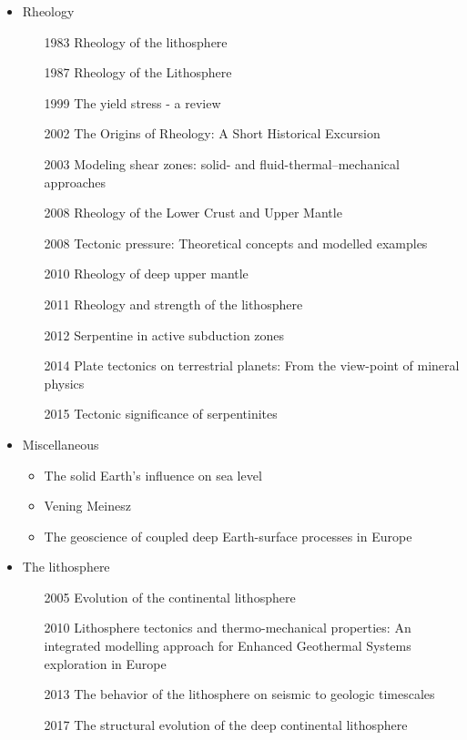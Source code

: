 \begin{itemize}
\item Rheology 
   \begin{itemize}
   \item [1983] Rheology of the lithosphere \cite{kirb83}
   \item [1987] Rheology of the Lithosphere \cite{kikr87}
   \item [1999] The yield stress - a review \cite{barn99}
   \item [2002] The Origins of Rheology: A Short Historical Excursion \cite{dora02}
   \item [2003] Modeling shear zones: solid- and fluid-thermal–mechanical approaches \cite{reyu03}
   \item [2008] Rheology of the Lower Crust and Upper Mantle \cite{budr08}
   \item [2008] Tectonic pressure: Theoretical concepts and modelled examples \cite{manc08}
   \item [2010] Rheology of deep upper mantle \cite{kara10}
   \item [2011] Rheology and strength of the lithosphere \cite{buro11}
   \item [2012] Serpentine in active subduction zones \cite{reyn12}
   \item [2014] Plate tectonics on terrestrial planets: From the view-point of mineral physics \cite{kara14}
   \item [2015] Tectonic significance of serpentinites \cite{gusr15}
   \end{itemize}

\item Miscellaneous
   \begin{itemize}
   \item The solid Earth’s influence on sea level \cite{conr13}  
   \item Vening Meinesz \cite{vlaa89}
   \item The geoscience of coupled deep Earth-surface processes in Europe \cite{clzb07}
   \end{itemize}

\item The lithosphere
   \begin{itemize}
   \item [2005] Evolution of the continental lithosphere \cite{slee05}
   \item [2010] Lithosphere tectonics and thermo-mechanical properties: An integrated modelling
         approach for Enhanced Geothermal Systems exploration in Europe \cite{clvz10}
   \item [2013] The behavior of the lithosphere on seismic to geologic timescales \cite{wazh13}
   \item [2017] The structural evolution of the deep continental lithosphere \cite{comm17}
   \end{itemize}


\end{itemize}
